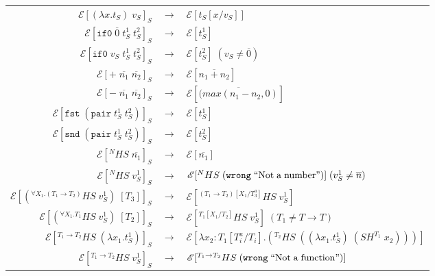 \begin{figure}
\onehalfspacing
\begin{center}
\begin{tabular}{rcl}
$\mathscr{E}[(\lambda x.t_{S})\;v_{S}]_{S}$ & $\rightarrow$ & $\mathscr{E}[t_{S}[x/v_{S}]]$ \\
$\mathscr{E}[\mathtt{if0}\;\overline{0}\;t_{S}^{1}\;t_{S}^{2}]_{S}$ & $\rightarrow$ & $\mathscr{E}[t_{S}^{1}]$ \\
$\mathscr{E}[\mathtt{if0}\;v_{S}\;t_{S}^{1}\;t_{S}^{2}]_{S}$ & $\rightarrow$ & $\mathscr{E}[t_{S}^{2}]\;(v_{S}\neq\overline{0})$ \\
$\mathscr{E}[+\;\overline{n_{1}}\;\overline{n_{2}}]_{S}$ & $\rightarrow$ & $\mathscr{E}[\overline{n_{1}+n_{2}}]$ \\
$\mathscr{E}[-\;\overline{n_{1}}\;\overline{n_{2}}]_{S}$ & $\rightarrow$ & $\mathscr{E}[\overline{(max(n_{1}-n_{2},0)}]$ \\
$\mathscr{E}[\mathtt{fst}\;(\mathtt{pair}\;t_{S}^{1}\;t_{S}^{2})]_{S}$ & $\rightarrow$ & $\mathscr{E}[t_{S}^{1}]$ \\
$\mathscr{E}[\mathtt{snd}\;(\mathtt{pair}\;t_{S}^{1}\;t_{S}^{2})]_{S}$ & $\rightarrow$ & $\mathscr{E}[t_{S}^{2}]$ \\
$\mathscr{E}[^{N}HS\;\overline{n_{1}}]_{S}$ & $\rightarrow$ & $\mathscr{E}[\overline{n_{1}}]$ \\
$\mathscr{E}[^{N}HS\;v_{S}^{1}]_{S}$ & $\rightarrow$ & $\mathscr{E}[^{N}HS\;(\mathtt{wrong}\;\mathrm{``Not\;a\;number"})]\;(v_{S}^{1}\neq\overline{n})$ \\
$\mathscr{E}[(^{\forall X_{1}.(T_{1}\rightarrow T_{2})}HS\;v_{S}^{1})\;[T_{3}]]_{S}$ & $\rightarrow$ & $\mathscr{E}[^{(T_{1}\rightarrow T_{2})[X_{1}/T^{a}_{3}]}HS\;v_{S}^{1}]$ \\
$\mathscr{E}[(^{\forall X_{1}.T_{1}}HS\;v_{S}^{1})\;[T_{2}]]_{S}$ & $\rightarrow$ & $\mathscr{E}[^{T_{1}[X_{1}/T_{2}]}HS\;v_{S}^{1}]\;(T_{1}\neq T\rightarrow T)$ \\
$\mathscr{E}[^{T_{1}\rightarrow T_{2}}HS\;(\lambda x_{1}.t_{S}^{1})]_{S}$ & $\rightarrow$ & $\mathscr{E}[\lambda x_{2}:T_{1}[T^{a}_{i}/T_{i}].(^{T_{2}}HS\;((\lambda x_{1}.t_{S}^{1})\;(SH^{T_{1}}\;x_{2})))]$ \\
$\mathscr{E}[^{T_{1}\rightarrow T_{2}}HS\;v_{S}^{1}]_{S}$ & $\rightarrow$ & $\mathscr{E}[^{T_{1}\rightarrow T_{2}}HS\;(\mathtt{wrong}\;\mathrm{``Not\;a\;function"})]$ \\

\end{tabular}
\end{center}
\end{figure}
